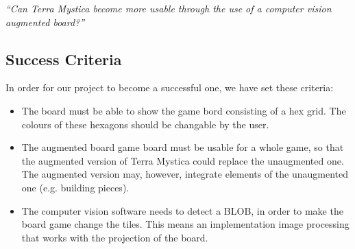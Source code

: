 \textit{“Can Terra Mystica become more usable through the use of a computer vision augmented board?”}

\subsection{Success Criteria}
In order for our project to become a successful one, we have set these criteria:
\begin{itemize}
	\item The board must be able to show the game bord consisting of a hex grid. The colours of these hexagons should be changable by the user.
	\item The augmented board game board must be usable for a whole game, so that the augmented version of Terra Mystica could replace the unaugmented one. The augmented version may, however, integrate elements of the unaugmented one (e.g. building pieces).
	\item The computer vision software needs to detect a BLOB, in order to make the board game change the tiles. This means an implementation image processing that works with the projection of the board.
\end{itemize} 